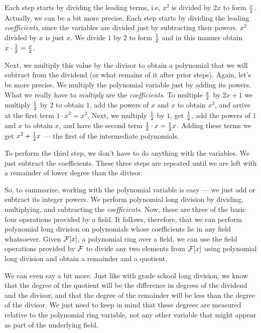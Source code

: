 

Each step starts by dividing the leading terms, i.e, $x^2$ is divided
by $2x$ to form $x\over 2$.  Actually, we can be a bit more precise.
Each step starts by dividing the leading {\it coefficients},
since the variables are divided just by subtracting their
powers. $x^2$ divided by $x$ is just $x$.  We divide $1$ by $2$
to form $1\over2$ and in this manner obtain $x\cdot{1\over2}={x\over2}$.

Next, we multiply this value by the divisor to obtain a polynomial
that we will subtract from the dividend (or what remains of it after
prior steps).  Again, let's be more precise.  We multiply the
polynomial variable just by adding its powers.  What we really have to
{\it multiply} are the {\it coefficients}.  To multiple $x\over2$ by
$2x+1$ we multiply $1\over2$ by $2$ to obtain $1$, add the powers of
$x$ and $x$ to obtain $x^2$, and arrive at the first term $1\cdot
x^2=x^2$.  Next, we multiply $1\over2$ by $1$, get $1\over2$, add the
powers of $1$ and $x$ to obtain $x$, and have the second term
${1\over2}\cdot x={1\over2}x$.  Adding these terms we get
$x^2+{1\over2}x$ --- the first of the intermediate polynomials.

To perform the third step, we don't have to do anything with
the variables.  We just subtract the coefficients.  These
three steps are repeated until we are left with a remainder
of lower degree than the divisor.

So, to summarize, working with the polynomial variable is easy --- we
just add or subtract its integer powers.  We perform polynomial long
division by dividing, multiplying, and subtracting the {\it
coefficients}.  Now, these are three of the basic four operations
provided by a field.  It follows, therefore, that we can perform
polynomial long division on polynomials whose coefficients lie in any
field whatsoever.  Given ${\cal F}[x]$, a polynomial ring over a
field, we can use the field operations provided by ${\cal F}$ to
divide any two elements from ${\cal F}[x]$ using polynomial long
division and obtain a remainder and a quotient.

We can even say a bit more.  Just like with grade school long
division, we know that the degree of the quotient will be the
difference in degrees of the dividend and the divisor, and that the
degree of the remainder will be less than the degree of the divisor.
We just need to keep in mind that these degrees are measured relative
to the polynomial ring variable, not any other variable that might
appear as part of the underlying field.

